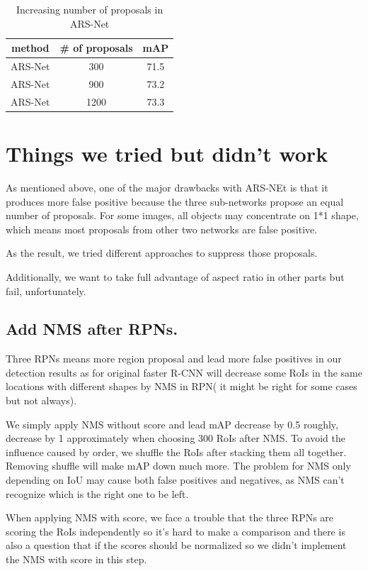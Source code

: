 \documentclass[10pt,twocolumn,letterpaper]{article}
\begin{document}
\begin{table}[ht]
\centering
\begin{tabular}{|c|c|c|}
\hline 
 method & \# of proposals & mAP
\\ \hline 
 ARS-Net & 300 & 71.5
\\ \hline 
 ARS-Net & 900 & 73.2
\\ \hline 
 ARS-Net & 1200 & 73.3
\\ \hline
\end{tabular}
\caption{Increasing number of proposals in ARS-Net}
\label{Exp2}
\end{table}


\section{Things we tried but didn't work}
\par
As mentioned above, one of the major drawbacks with ARS-NEt is that it produces more false positive because the three sub-networks propose an equal number of proposals. For some images, all objects may concentrate on 1*1 shape, which means most proposals from other two networks are false positive.
\par
As the result, we tried different approaches to suppress those proposals.
\par 
Additionally, we want to take full advantage of aspect ratio in other parts but fail, unfortunately.
\subsection{Add NMS after RPNs.}
\par
Three RPNs means more region proposal and lead more false positives in our detection results as for original faster R-CNN will decrease some RoIs in the same locations with different shapes by NMS in RPN( it might be right for some cases but not always).

\par
We simply apply NMS without score and lead mAP decrease by 0.5 roughly, decrease by 1 approximately when choosing 300 RoIs after NMS. To avoid the influence caused by order, we shuffle the RoIs after stacking them all together. Removing shuffle will make mAP down much more. The problem for NMS only depending on IoU may cause both false positives and negatives, as NMS can't recognize which is the right one to be left.

\par
When applying NMS with score, we face a trouble that the three RPNs are scoring the RoIs independently so it’s hard to make a comparison and there is also a question that if the scores should be normalized so we didn’t implement the NMS with score in this step.
\end{document}
